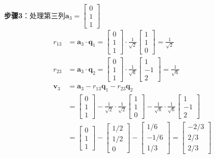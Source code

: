 \documentclass[12pt,a4paper]{article}
\begin{document}
\textbf{步骤3}：处理第三列$\bm{a}_3 = \begin{bmatrix} 0 \\ 1 \\ 1 \end{bmatrix}$
\begin{align}
r_{13} &= \bm{a}_3 \cdot \bm{q}_1 = \begin{bmatrix} 0 \\ 1 \\ 1 \end{bmatrix} \cdot \frac{1}{\sqrt{2}} \begin{bmatrix} 1 \\ 1 \\ 0 \end{bmatrix} = \frac{1}{\sqrt{2}} \\
r_{23} &= \bm{a}_3 \cdot \bm{q}_2 = \begin{bmatrix} 0 \\ 1 \\ 1 \end{bmatrix} \cdot \frac{1}{\sqrt{6}} \begin{bmatrix} 1 \\ -1 \\ 2 \end{bmatrix} = \frac{1}{\sqrt{6}} \\
\bm{v}_3 &= \bm{a}_3 - r_{13} \bm{q}_1 - r_{23} \bm{q}_2 \\
&= \begin{bmatrix} 0 \\ 1 \\ 1 \end{bmatrix} - \frac{1}{\sqrt{2}} \cdot \frac{1}{\sqrt{2}} \begin{bmatrix} 1 \\ 1 \\ 0 \end{bmatrix} - \frac{1}{\sqrt{6}} \cdot \frac{1}{\sqrt{6}} \begin{bmatrix} 1 \\ -1 \\ 2 \end{bmatrix} \\
&= \begin{bmatrix} 0 \\ 1 \\ 1 \end{bmatrix} - \begin{bmatrix} 1/2 \\ 1/2 \\ 0 \end{bmatrix} - \begin{bmatrix} 1/6 \\ -1/6 \\ 1/3 \end{bmatrix} = \begin{bmatrix} -2/3 \\ 2/3 \\ 2/3 \end{bmatrix} \\

\end{align}
\end{document}
